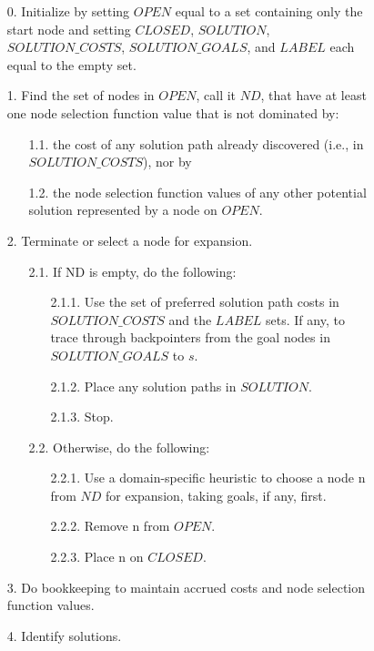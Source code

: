 \begin{figure}
\begin{itemize}\setlength{\itemsep}{-2mm}  
  \item[0. ] Initialize by setting $OPEN$ equal to a set containing only the start node and setting $CLOSED$, $SOLUTION$, $SOLUTION\_COSTS$, $SOLUTION\_GOALS$, and $LABEL$ each equal to the empty set.
  \item[1. ] Find the set of nodes in $OPEN$, call it $ND$, that have at least one node selection function value that is not dominated by:
  \begin{itemize}\setlength{\itemsep}{-2mm}
    \item[1.1. ] the cost of any solution path already discovered (i.e., in $SOLUTION\_COSTS$), nor by
    \item[1.2. ] the node selection function values of any other potential solution represented by a node on $OPEN$.
  \end{itemize}
  \item[2. ] Terminate or select a node for expansion.
  \begin{itemize}\setlength{\itemsep}{-2mm}
  	\item[2.1. ] If ND is empty, do the following:
  	\begin{itemize}
  		\item[2.1.1. ] Use the set of preferred solution path costs in $SOLUTION\_COSTS$ and the $LABEL$ sets. If any, to trace through backpointers from the goal nodes in $SOLUTION\_GOALS$ to $s$.	
		\item[2.1.2. ] Place any solution paths in $SOLUTION$.
		\item[2.1.3. ] Stop.
  	\end{itemize}
  	\item[2.2. ] Otherwise, do the following:
  	\begin{itemize}
  		\item[2.2.1. ] Use a domain-specific heuristic to choose a node n from $ND$ for expansion, taking goals, if any, first.
		\item[2.2.2. ] Remove n from $OPEN$.
		\item[2.2.3. ] Place n on $CLOSED$.
	\end{itemize}
  \end{itemize}
  \item[3. ] Do bookkeeping to maintain accrued costs and node selection function values.
  \item[4. ] Identify solutions.
  \begin{itemize}\setlength{\itemsep}{-2mm}

\end{itemize}
\end{itemize}
\end{figure}
